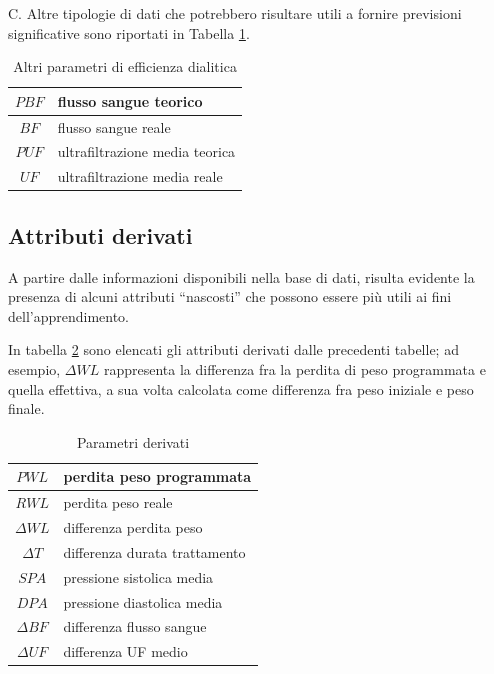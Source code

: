 \documentclass[preprint]{acm_proc_article-sp}
\begin{document}
C. Altre tipologie di dati che potrebbero risultare utili a fornire previsioni significative sono riportati in Tabella \ref{table:parametri-3}.

\begin{table}[h]
\centering
\begin{tabular}{|c|l|} \hline
$PBF$ & flusso sangue teorico\\ \hline
$BF$ & flusso sangue reale\\ \hline
$PUF$ & ultrafiltrazione media teorica\\ \hline
$UF$ & ultrafiltrazione media reale\\
\hline\end{tabular}
\caption{Altri parametri di efficienza dialitica}
\label{table:parametri-3}
\end{table}

\subsection{Attributi derivati}\label{attributi-derivati}
A partire dalle informazioni disponibili nella base di dati, risulta evidente la presenza di alcuni attributi ``nascosti'' che possono essere più utili ai fini dell'apprendimento.

In tabella \ref{table:parametri-derivati} sono elencati gli attributi derivati dalle precedenti tabelle; ad esempio, $\Delta WL$ rappresenta la differenza fra la perdita di peso programmata e quella effettiva, a sua volta calcolata come differenza fra peso iniziale e peso finale.

\begin{table}[h]
\centering
\begin{tabular}{|c|l|} \hline
$PWL$ & perdita peso programmata\\ \hline
$RWL$ & perdita peso reale\\ \hline
$\Delta WL$ & differenza perdita peso\\ \hline
$\Delta T$ & differenza durata trattamento\\ \hline
$SPA$ & pressione sistolica media \\ \hline
$DPA$ & pressione diastolica media \\ \hline
$\Delta BF$ & differenza flusso sangue \\ \hline
$\Delta UF$ & differenza UF medio \\
\hline\end{tabular}
\caption{Parametri derivati}
\label{table:parametri-derivati}
\end{table}
\end{document}
